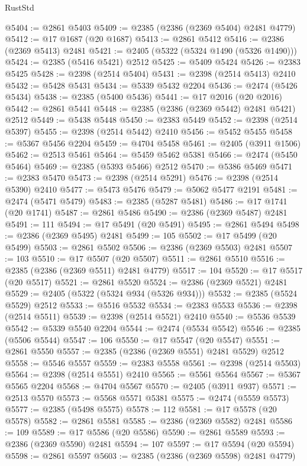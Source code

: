 \begin{lexlean}{RustStd}
\begin{coremodule}
{\begin{coremodule}
{{{{{{{{{{{{{{{{{{{{{{{{{{{{{{{{{{{{{{{{{{{{{{{{{{@5404 := @2861 @5403
@5409 := @2385 (@2386 (@2369 @5404) @2481 @4779)
@5412 := @17 @1687 (@20 @1687)
@5413 := @2861 @5412
@5416 := @2386 (@2369 @5413) @2481
@5421 := @2405 (@5322 (@5324 @1490 (@5326 @1490)))
@5424 := @2385 (@5416 @5421) @2512
@5425 := @5409 @5424
@5426 := @2383 @5425
@5428 := @2398 (@2514 @5404)
@5431 := @2398 (@2514 @5413) @2410
@5432 := @5428 @5431
@5434 := @5339 @5432 @2204
@5436 := @2474 (@5426 @5434)
@5438 := @2385 (@5400 @5436)
@5441 := @17 @2016 (@20 @2016)
@5442 := @2861 @5441
@5448 := @2385 (@2386 (@2369 @5442) @2481 @5421) @2512
@5449 := @5438 @5448
@5450 := @2383 @5449
@5452 := @2398 (@2514 @5397)
@5455 := @2398 (@2514 @5442) @2410
@5456 := @5452 @5455
@5458 := @5367 @5456 @2204
@5459 := @4704 @5458
@5461 := @2405 (@3911 @1506)
@5462 := @2513 @5461
@5464 := @5459 @5462 @5381
@5466 := @2474 (@5450 @5464)
@5469 := @2385 (@5393 @5466) @2512
@5470 := @5386 @5469
@5471 := @2383 @5470
@5473 := @2398 (@2514 @5291)
@5476 := @2398 (@2514 @5390) @2410
@5477 := @5473 @5476
@5479 := @5062 @5477 @2191
@5481 := @2474 (@5471 @5479)
@5483 := @2385 (@5287 @5481)
@5486 := @17 @1741 (@20 @1741)
@5487 := @2861 @5486
@5490 := @2386 (@2369 @5487) @2481
@5491 := 111
@5494 := @17 @5491 (@20 @5491)
@5495 := @2861 @5494
@5498 := @2386 (@2369 @5495) @2481
@5499 := 105
@5502 := @17 @5499 (@20 @5499)
@5503 := @2861 @5502
@5506 := @2386 (@2369 @5503) @2481
@5507 := 103
@5510 := @17 @5507 (@20 @5507)
@5511 := @2861 @5510
@5516 := @2385 (@2386 (@2369 @5511) @2481 @4779)
@5517 := 104
@5520 := @17 @5517 (@20 @5517)
@5521 := @2861 @5520
@5524 := @2386 (@2369 @5521) @2481
@5529 := @2405 (@5322 (@5324 @934 (@5326 @934)))
@5532 := @2385 (@5524 @5529) @2512
@5533 := @5516 @5532
@5534 := @2383 @5533
@5536 := @2398 (@2514 @5511)
@5539 := @2398 (@2514 @5521) @2410
@5540 := @5536 @5539
@5542 := @5339 @5540 @2204
@5544 := @2474 (@5534 @5542)
@5546 := @2385 (@5506 @5544)
@5547 := 106
@5550 := @17 @5547 (@20 @5547)
@5551 := @2861 @5550
@5557 := @2385 (@2386 (@2369 @5551) @2481 @5529) @2512
@5558 := @5546 @5557
@5559 := @2383 @5558
@5561 := @2398 (@2514 @5503)
@5564 := @2398 (@2514 @5551) @2410
@5565 := @5561 @5564
@5567 := @5367 @5565 @2204
@5568 := @4704 @5567
@5570 := @2405 (@3911 @937)
@5571 := @2513 @5570
@5573 := @5568 @5571 @5381
@5575 := @2474 (@5559 @5573)
@5577 := @2385 (@5498 @5575)
@5578 := 112
@5581 := @17 @5578 (@20 @5578)
@5582 := @2861 @5581
@5585 := @2386 (@2369 @5582) @2481
@5586 := 109
@5589 := @17 @5586 (@20 @5586)
@5590 := @2861 @5589
@5593 := @2386 (@2369 @5590) @2481
@5594 := 107
@5597 := @17 @5594 (@20 @5594)
@5598 := @2861 @5597
@5603 := @2385 (@2386 (@2369 @5598) @2481 @4779)
}}}}}}}}}}}}}}}}}}}}}}}}}}}}}}}}}}}}}}}}}}}}}}}}}}
\end{coremodule}}
\end{coremodule}
\end{lexlean}
